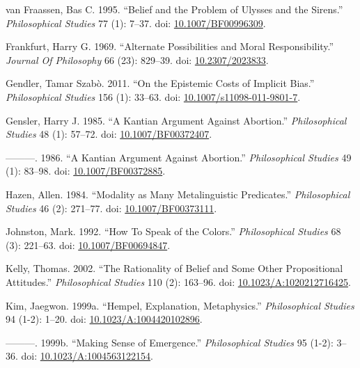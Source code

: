 \documentclass[
  10pt,
  letterpaper,
  DIV=11,
  numbers=noendperiod,
  twoside]{scrartcl}
\newlength{\cslhangindent}
\newenvironment{CSLReferences}[2] %
 {\begin{list}{}{%
  \setlength{\itemindent}{0pt}
  \setlength{\leftmargin}{0pt}
  \setlength{\parsep}{0pt}
  \ifodd #1
   \setlength{\leftmargin}{\cslhangindent}
   \setlength{\itemindent}{-1\cslhangindent}
  \fi
  \setlength{\itemsep}{#2\baselineskip}}}
 {\end{list}}
\begin{document}
\begin{CSLReferences}{1}{0}
van Fraassen, Bas C. 1995. {``Belief and the Problem of Ulysses and the
Sirens.''} \emph{Philosophical Studies} 77 (1): 7--37. doi:
\href{https://doi.org/10.1007/BF00996309}{10.1007/BF00996309}.

Frankfurt, Harry G. 1969. {``Alternate Possibilities and Moral
Responsibility.''} \emph{Journal Of Philosophy} 66 (23): 829--39. doi:
\href{https://doi.org/10.2307/2023833}{10.2307/2023833}.

Gendler, Tamar Szabò. 2011. {``On the Epistemic Costs of Implicit
Bias.''} \emph{Philosophical Studies} 156 (1): 33--63. doi:
\href{https://doi.org/10.1007/s11098-011-9801-7}{10.1007/s11098-011-9801-7}.

Gensler, Harry J. 1985. {``A Kantian Argument Against Abortion.''}
\emph{Philosophical Studies} 48 (1): 57--72. doi:
\href{https://doi.org/10.1007/BF00372407}{10.1007/BF00372407}.

---------. 1986. {``A Kantian Argument Against Abortion.''}
\emph{Philosophical Studies} 49 (1): 83--98. doi:
\href{https://doi.org/10.1007/BF00372885}{10.1007/BF00372885}.

Hazen, Allen. 1984. {``Modality as Many Metalinguistic Predicates.''}
\emph{Philosophical Studies} 46 (2): 271--77. doi:
\href{https://doi.org/10.1007/BF00373111}{10.1007/BF00373111}.

Johnston, Mark. 1992. {``How To Speak of the Colors.''}
\emph{Philosophical Studies} 68 (3): 221--63. doi:
\href{https://doi.org/10.1007/BF00694847}{10.1007/BF00694847}.

Kelly, Thomas. 2002. {``The Rationality of Belief and Some Other
Propositional Attitudes.''} \emph{Philosophical Studies} 110 (2):
163--96. doi:
\href{https://doi.org/10.1023/A:1020212716425}{10.1023/A:1020212716425}.

Kim, Jaegwon. 1999a. {``Hempel, Explanation, Metaphysics.''}
\emph{Philosophical Studies} 94 (1-2): 1--20. doi:
\href{https://doi.org/10.1023/A:1004420102896}{10.1023/A:1004420102896}.

---------. 1999b. {``Making Sense of Emergence.''} \emph{Philosophical
Studies} 95 (1-2): 3--36. doi:
\href{https://doi.org/10.1023/A:1004563122154}{10.1023/A:1004563122154}.


\end{CSLReferences}
\end{document}
